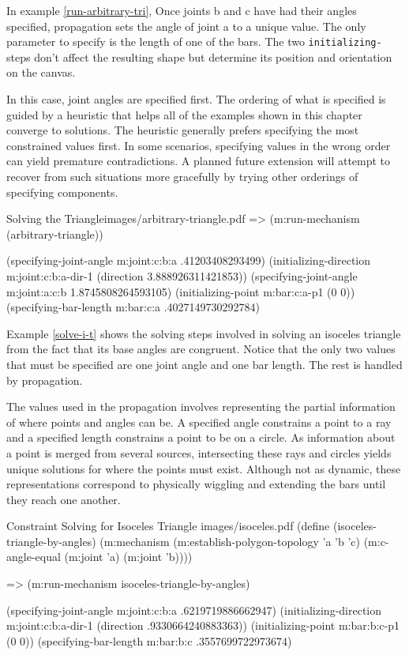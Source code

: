 In example \ref{run-arbitrary-tri}, Once joints b and c have had their angles specified, propagation
sets the angle of joint a to a unique value. The only parameter
to specify is the length of one of the bars. The two
\texttt{initializing-} steps don't affect the resulting shape but
determine its position and orientation on the canvas.

In this case, joint angles are specified first. The ordering of what
is specified is guided by a heuristic that helps all of the examples
shown in this chapter converge to solutions. The heuristic generally
prefers specifying the most constrained values first. In some
scenarios, specifying values in the wrong order can yield premature
contradictions. A planned future extension will attempt to recover
from such situations more gracefully by trying other orderings of
specifying components.

\begin{pdf-example}
[label=run-arbitrary-tri]
{Solving the Triangle}{images/arbitrary-triangle.pdf}
=> (m:run-mechanism (arbitrary-triangle))

(specifying-joint-angle m:joint:c:b:a .41203408293499)
(initializing-direction m:joint:c:b:a-dir-1 (direction 3.888926311421853))
(specifying-joint-angle m:joint:a:c:b 1.8745808264593105)
(initializing-point m:bar:c:a-p1 (0 0))
(specifying-bar-length m:bar:c:a .4027149730292784)
\end{pdf-example}

Example \ref{solve-i-t} shows the solving steps involved in solving an
isoceles triangle from the fact that its base angles are
congruent. Notice that the only two values that must be specified are
one joint angle and one bar length. The rest is handled by propagation.

The values used in the propagation involves representing the partial
information of where points and angles can be. A specified angle
constrains a point to a ray and a specified length constrains a point
to be on a circle. As information about a point is merged from several
sources, intersecting these rays and circles yields unique solutions
for where the points must exist. Although not as dynamic, these
representations correspond to physically wiggling and extending the
bars until they reach one another.

\begin{pdf-example}
[label=solve-i-t]
{Constraint Solving for Isoceles Triangle}
{images/isoceles.pdf}
(define (isoceles-triangle-by-angles)
  (m:mechanism
   (m:establish-polygon-topology 'a 'b 'c)
   (m:c-angle-equal (m:joint 'a)
                    (m:joint 'b))))

=> (m:run-mechanism  isoceles-triangle-by-angles)

(specifying-joint-angle m:joint:c:b:a .6219719886662947)
(initializing-direction m:joint:c:b:a-dir-1 (direction .9330664240883363))
(initializing-point m:bar:b:c-p1 (0 0))
(specifying-bar-length m:bar:b:c .3557699722973674)
\end{pdf-example}

